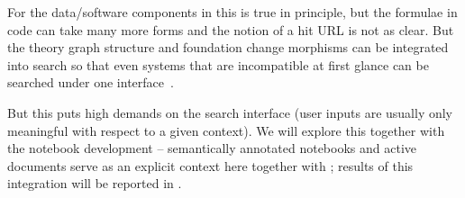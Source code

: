 \begin{workpackage}[id=dksbases,%
  title=Data/Knowledge/Software-Bases,lead=JU,
  ZHRM=12,JURM=46,UWRM=25,SARM=10,LLRM=2,PSRM=4]
\begin{tasklist}
\begin{task}[id=mws,title=Math Search Engine,lead=JU,PM=10]
  For the data/software components in \DKS this is true in principle, but the formulae in
  code can take many more forms and the notion of a hit URL is not as clear. But the
  theory graph structure and foundation change morphisms can be integrated into search so
  that even systems that are incompatible at first glance can be searched under one
  interface~\cite{KohIan:ssmk12}.

  But this puts high demands on the search interface (user inputs are usually only
  meaningful with respect to a given context). We will explore this together with the
  notebook development -- semantically annotated notebooks and active documents serve as
  an explicit context here together with ; results of this integration will be
  reported in .
\end{task}

\end{tasklist}


\end{workpackage}
